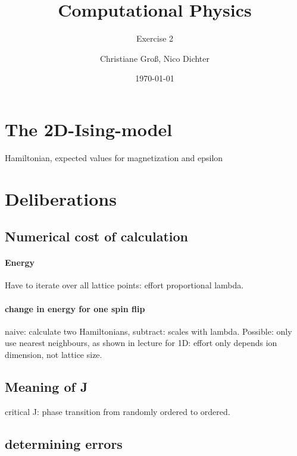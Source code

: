 \documentclass{scrartcl}
\title{Computational Physics}
\subtitle{Exercise 2}
\date{\today}
\author{Christiane Groß, Nico Dichter}
\begin{document}
	\maketitle
\section{The 2D-Ising-model}
Hamiltonian, expected values for magnetization and epsilon

\section{Deliberations}
\subsection{Numerical cost of calculation}
\paragraph{Energy} Have to iterate over all lattice points: effort proportional lambda.

\paragraph{change in energy for one spin flip}
naive: calculate two Hamiltonians, subtract: scales with lambda. 
Possible: only use nearest neighbours, as shown in lecture for 1D: effort only depends ion dimension, not lattice size.

\subsection{Meaning of J} critical J: phase transition from randomly ordered to ordered.

\subsection{determining errors}
\end{document}
